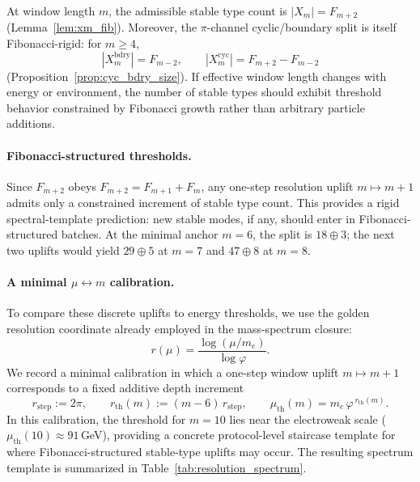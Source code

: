 At window length $m$, the admissible stable type count is $|X_m|=F_{m+2}$ (Lemma~\ref{lem:xm_fib}).
Moreover, the $\pi$-channel cyclic/boundary split is itself Fibonacci-rigid:
for $m\ge 4$,
\[
|X_m^{\mathrm{bdry}}|=F_{m-2},\qquad |X_m^{\mathrm{cyc}}|=F_{m+2}-F_{m-2}
\]
(Proposition~\ref{prop:cyc_bdry_size}).
If effective window length changes with energy or environment, the number of stable types should exhibit threshold behavior constrained by Fibonacci growth rather than arbitrary particle additions.
\paragraph{Fibonacci-structured thresholds.}
Since $F_{m+2}$ obeys $F_{m+2}=F_{m+1}+F_m$, any one-step resolution uplift $m\mapsto m+1$ admits only a constrained increment of stable type count.
This provides a rigid spectral-template prediction: new stable modes, if any, should enter in Fibonacci-structured batches.
At the minimal anchor $m=6$, the split is $18\oplus 3$; the next two uplifts would yield $29\oplus 5$ at $m=7$ and $47\oplus 8$ at $m=8$.

\paragraph{A minimal $\mu\leftrightarrow m$ calibration.}
To compare these discrete uplifts to energy thresholds, we use the golden resolution coordinate already employed in the mass-spectrum closure:
\[
r(\mu)=\frac{\log(\mu/m_e)}{\log\varphi}.
\]
We record a minimal calibration in which a one-step window uplift $m\mapsto m+1$ corresponds to a fixed additive depth increment
\[
r_{\mathrm{step}}:=2\pi,
\qquad
r_{\mathrm{th}}(m):=(m-6)\,r_{\mathrm{step}},
\qquad
\mu_{\mathrm{th}}(m)=m_e\,\varphi^{\,r_{\mathrm{th}}(m)}.
\]
In this calibration, the threshold for $m=10$ lies near the electroweak scale ($\mu_{\mathrm{th}}(10)\approx 91\,$GeV), providing a concrete protocol-level staircase template for where Fibonacci-structured stable-type uplifts may occur.
The resulting spectrum template is summarized in Table~\ref{tab:resolution_spectrum}.

